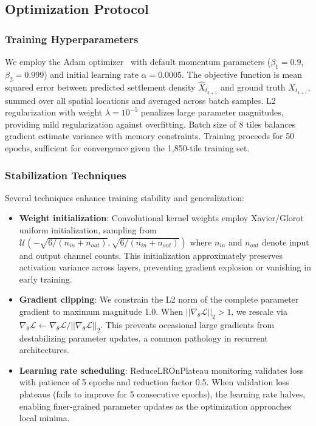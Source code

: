 \documentclass[conference]{IEEEtran}
\begin{document}
\subsection{Optimization Protocol}

\subsubsection{Training Hyperparameters}
We employ the Adam optimizer~\cite{kingma2015} with default momentum parameters ($\beta_1=0.9$, $\beta_2=0.999$) and initial learning rate $\alpha=0.0005$. The objective function is mean squared error between predicted settlement density $\hat{X}_{t_{k+1}}$ and ground truth $X_{t_{k+1}}$, summed over all spatial locations and averaged across batch samples. L2 regularization with weight $\lambda=10^{-5}$ penalizes large parameter magnitudes, providing mild regularization against overfitting. Batch size of 8 tiles balances gradient estimate variance with memory constraints. Training proceeds for 50 epochs, sufficient for convergence given the 1,850-tile training set.

\subsubsection{Stabilization Techniques}
Several techniques enhance training stability and generalization:
\begin{itemize}
    \item \textbf{Weight initialization}: Convolutional kernel weights employ Xavier/Glorot uniform initialization, sampling from $\mathcal{U}(-\sqrt{6/(n_{in}+n_{out})}, \sqrt{6/(n_{in}+n_{out})})$ where $n_{in}$ and $n_{out}$ denote input and output channel counts. This initialization approximately preserves activation variance across layers, preventing gradient explosion or vanishing in early training.
    
    \item \textbf{Gradient clipping}: We constrain the L2 norm of the complete parameter gradient to maximum magnitude 1.0. When $||\nabla_\theta \mathcal{L}||_2 > 1$, we rescale via $\nabla_\theta \mathcal{L} \leftarrow \nabla_\theta \mathcal{L} / ||\nabla_\theta \mathcal{L}||_2$. This prevents occasional large gradients from destabilizing parameter updates, a common pathology in recurrent architectures.
    
    \item \textbf{Learning rate scheduling}: ReduceLROnPlateau monitoring validates loss with patience of 5 epochs and reduction factor 0.5. When validation loss plateaus (fails to improve for 5 consecutive epochs), the learning rate halves, enabling finer-grained parameter updates as the optimization approaches local minima.
\end{itemize}
\end{document}
